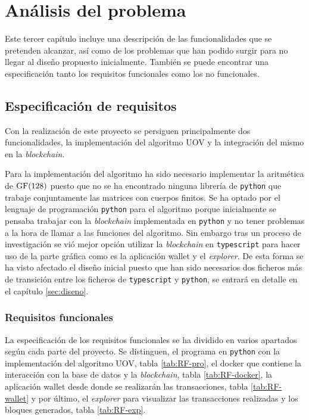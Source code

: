 \chapter{Análisis del problema}

Este tercer capítulo incluye una descripción de las funcionalidades que se pretenden alcanzar, así como de los problemas que han podido surgir para no llegar al diseño propuesto inicialmente. También se puede encontrar una especificación tanto los requisitos funcionales como los no funcionales.

\section{Especificación de requisitos}

Con la realización de este proyecto se persiguen principalmente dos funcionalidades, la implementación del algoritmo UOV y la integración del mismo en la \textit{blockchain}.

Para la implementación del algoritmo ha sido necesario implementar la aritmética de $\operatorname{GF}(128)$ puesto que no se ha encontrado ninguna librería de \texttt{python} que trabaje conjuntamente las matrices con cuerpos finitos. Se ha optado por el lenguaje de programación \texttt{python} para el algoritmo porque inicialmente se pensaba trabajar con la \textit{blockchain} implementada en \texttt{python} y no tener problemas a la hora de llamar a las funciones del algoritmo. Sin embargo tras un proceso de investigación se vió mejor opción utilizar la \textit{blockchain} en \texttt{typescript} para hacer uso de la parte gráfica como es la aplicación wallet y el \textit{explorer}. De esta forma se ha visto afectado el diseño inicial puesto que han sido necesarios dos ficheros más de transición entre los ficheros de \texttt{typescript} y \texttt{python}, se entrará en detalle en el capítulo \ref{sec:diseno}.

\subsection{Requisitos funcionales}

La especificación de los requisitos funcionales se ha dividido en varios apartados según cada parte del proyecto. Se distinguen, el programa en \texttt{python} con la implementación del algoritmo UOV, tabla \ref{tab:RF-pro}, el docker que contiene la interacción con la base de datos y la \textit{blockchain}, tabla \ref{tab:RF-docker}, la aplicación wallet desde donde se realizarán las transacciones, tabla \ref{tab:RF-wallet} y por último, el \textit{explorer} para visualizar las transacciones realizadas y los bloques generados, tabla \ref{tab:RF-exp}.

